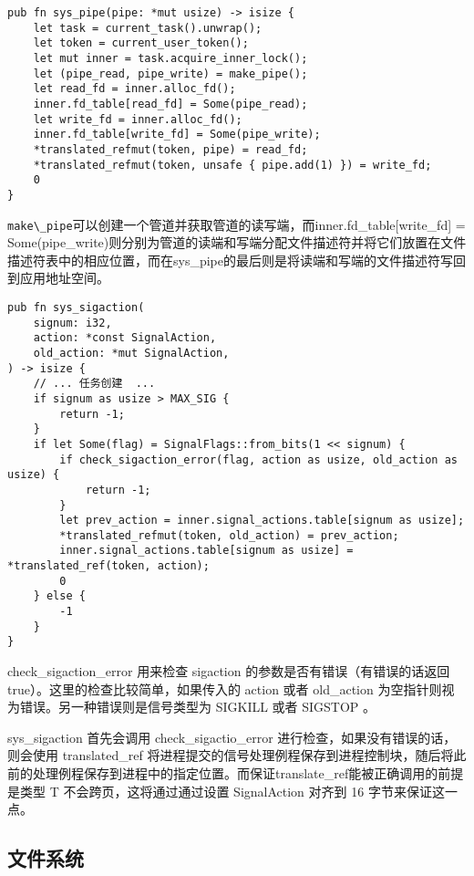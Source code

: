 \begin{lstlisting}[caption=sys\_pipe的系统调用]
pub fn sys_pipe(pipe: *mut usize) -> isize {
    let task = current_task().unwrap();
    let token = current_user_token();
    let mut inner = task.acquire_inner_lock();
    let (pipe_read, pipe_write) = make_pipe();
    let read_fd = inner.alloc_fd();
    inner.fd_table[read_fd] = Some(pipe_read);
    let write_fd = inner.alloc_fd();
    inner.fd_table[write_fd] = Some(pipe_write);
    *translated_refmut(token, pipe) = read_fd;
    *translated_refmut(token, unsafe { pipe.add(1) }) = write_fd;
    0
} 
\end{lstlisting}

\verb|make\_pipe|可以创建一个管道并获取管道的读写端，而inner.fd\_table[write\_fd] = Some(pipe\_write)则分别为管道的读端和写端分配文件描述符并将它们放置在文件描述符表中的相应位置，而在sys\_pipe的最后则是将读端和写端的文件描述符写回到应用地址空间。

\begin{lstlisting}[caption=sys\_sigactiion的系统调用]
pub fn sys_sigaction(
    signum: i32,
    action: *const SignalAction,
    old_action: *mut SignalAction,
) -> isize {
    // ... 任务创建  ...
    if signum as usize > MAX_SIG {
        return -1;
    }
    if let Some(flag) = SignalFlags::from_bits(1 << signum) {
        if check_sigaction_error(flag, action as usize, old_action as usize) {
            return -1;
        }
        let prev_action = inner.signal_actions.table[signum as usize];
        *translated_refmut(token, old_action) = prev_action;
        inner.signal_actions.table[signum as usize] = *translated_ref(token, action);
        0
    } else {
        -1
    }
}
\end{lstlisting}


check\_sigaction\_error 用来检查 sigaction 的参数是否有错误（有错误的话返回 true）。这里的检查比较简单，如果传入的 action 或者 old\_action 为空指针则视为错误。另一种错误则是信号类型为 SIGKILL 或者 SIGSTOP 。

sys\_sigaction 首先会调用 check\_sigactio\_error 进行检查，如果没有错误的话，则会使用 translated\_ref 将进程提交的信号处理例程保存到进程控制块，随后将此前的处理例程保存到进程中的指定位置。而保证translate\_ref能被正确调用的前提是类型 T 不会跨页，这将通过通过设置 SignalAction 对齐到 16 字节来保证这一点。

\subsection{文件系统}

